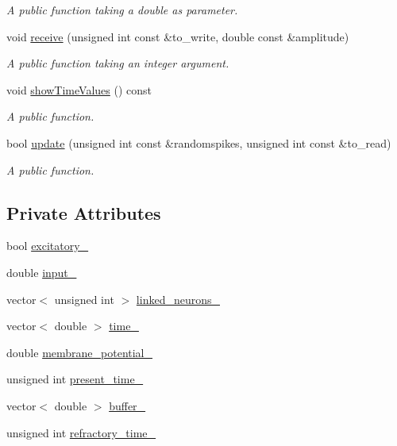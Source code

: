 \begin{DoxyCompactItemize}
\begin{DoxyCompactList}\small\item\em A public function taking a double as parameter. \end{DoxyCompactList}\item 
void \hyperlink{classNeuron_aa9a049a8a1f452535cea30b7f0c3f098}{receive} (unsigned int const \&to\-\_\-write, double const \&amplitude)
\begin{DoxyCompactList}\small\item\em A public function taking an integer argument. \end{DoxyCompactList}\item 
void \hyperlink{classNeuron_ac13c55318bd649c28cea12c74e6e134e}{show\-Time\-Values} () const 
\begin{DoxyCompactList}\small\item\em A public function. \end{DoxyCompactList}\item 
bool \hyperlink{classNeuron_a89ba2df0157a060f1c1be96479f7c3ed}{update} (unsigned int const \&randomspikes, unsigned int const \&to\-\_\-read)
\begin{DoxyCompactList}\small\item\em A public function. \end{DoxyCompactList}\end{DoxyCompactItemize}
\subsection*{Private Attributes}
\begin{DoxyCompactItemize}
\item 
bool \hyperlink{classNeuron_a4450ff3bd20d2e5b4f74746068b8d461}{excitatory\-\_\-}
\item 
double \hyperlink{classNeuron_a9ed47eb032d964fdebc77bca888226fa}{input\-\_\-}
\item 
vector$<$ unsigned int $>$ \hyperlink{classNeuron_a71f410f0b2026456ab554bfb6f1b4b9e}{linked\-\_\-neurons\-\_\-}
\item 
vector$<$ double $>$ \hyperlink{classNeuron_a7674c161dce2a7990b2ae2ebaa638ff6}{time\-\_\-}
\item 
double \hyperlink{classNeuron_a58829bf280bb52776e8842c71a92af4a}{membrane\-\_\-potential\-\_\-}
\item 
unsigned int \hyperlink{classNeuron_a392877d74e2b7f46002cf8576c13c384}{present\-\_\-time\-\_\-}
\item 
vector$<$ double $>$ \hyperlink{classNeuron_ab2abc06234893064464b0c5ac4374ada}{buffer\-\_\-}
\item 
unsigned int \hyperlink{classNeuron_a09591c9e23ff936d8479d3abb087439e}{refractory\-\_\-time\-\_\-}
\end{DoxyCompactItemize}


